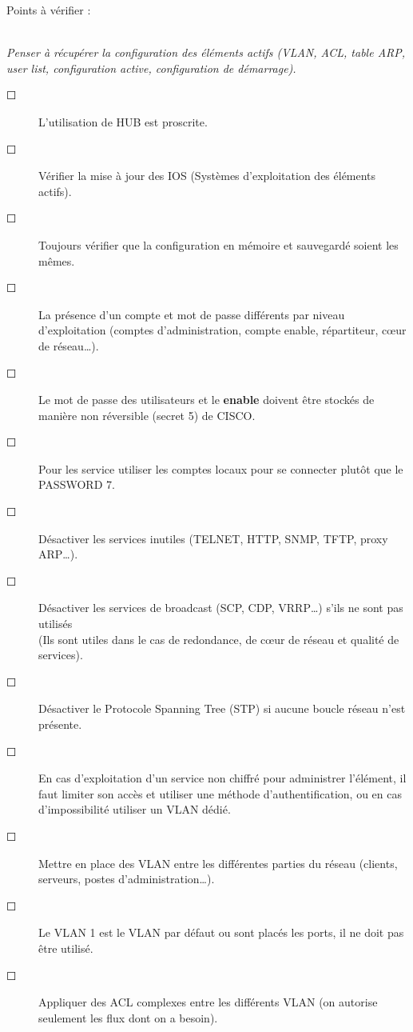 \documentclass[a4paper,11pt]{article}				    %
\begin{document}
{\begin{LARGE}Points \`a v\'erifier : \end{LARGE}\\
\textit{\small Penser \`a r\'ecup\'erer la configuration des \'el\'ements actifs (VLAN, ACL, table ARP, user list, configuration active, configuration de d\'emarrage).}
\begin{description}
    \item[$\Square$] L'utilisation de HUB est proscrite.
    \item[$\Square$] V\'erifier la mise \`a jour des IOS (Syst\`emes d'exploitation des \'el\'ements actifs).
    \item[$\Square$] Toujours v\'erifier que la configuration en m\'emoire et sauvegard\'e soient les m\^emes.
    \item[$\Square$] La pr\'esence d'un compte et mot de passe diff\'erents par niveau d'exploitation (comptes d'administration, compte enable, r\'epartiteur, c\oe ur de r\'eseau\dots{}).
    \item[$\Square$] Le mot de passe des utilisateurs et le \textbf{enable} doivent \^etre stock\'es de mani\`ere non r\'eversible (secret 5) de CISCO.
    \item[$\Square$] Pour les service utiliser les comptes locaux pour se connecter plut\^ot que le PASSWORD 7.
    \item[$\Square$] D\'esactiver les services inutiles (TELNET, HTTP, SNMP, TFTP, proxy ARP\dots{}).
    \item[$\Square$] D\'esactiver les services de broadcast (SCP, CDP, VRRP\dots{}) s'ils ne sont pas utilis\'es\\ (Ils sont utiles dans le cas de redondance, de c\oe ur de r\'eseau et qualit\'e de services).
    \item[$\Square$] D\'esactiver le Protocole Spanning Tree (STP) si aucune boucle r\'eseau n'est pr\'esente.
    \item[$\Square$] En cas d'exploitation d'un service non chiffr\'e pour administrer l'\'el\'ement, il faut limiter son acc\`es et utiliser une m\'ethode d'authentification, ou en cas d'impossibilit\'e utiliser un VLAN d\'edi\'e.
    \item[$\Square$] Mettre en place des VLAN entre les diff\'erentes parties du r\'eseau (clients, serveurs, postes d'administration\dots{}).
    \item[$\Square$] Le VLAN 1 est le VLAN par d\'efaut ou sont plac\'es les ports, il ne doit pas \^etre utilis\'e.
    \item[$\Square$] Appliquer des ACL complexes entre les diff\'erents VLAN (on autorise seulement les flux dont on a besoin). 

\end{description}}
\end{document}
